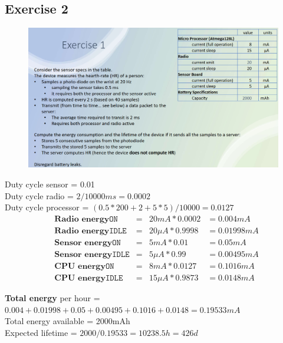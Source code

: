 \subsection*{Exercise 2}
\begin{figure}[htbp]
   \centering
   \includegraphics{images/energy_exercise2.png}
   \label{fig:energy_exercise2}
\end{figure}

Duty cycle sensor = 0.01\\
Duty cycle radio = $2 / 10000ms = 0.0002$\\
Duty cycle processor = $(0.5 * 200 + 2 + 5*5)/10000 = 0.0127$
\begin{align*}
   &\textbf{Radio energy} \texttt{ON} &=& 20mA * 0.0002 &= 0.004mA\\ 
   &\textbf{Radio energy} \texttt{IDLE} &=& 20\mu A * 0.9998 &= 0.01998mA\\
   &\textbf{Sensor energy} \texttt{ON} &=& 5mA *0.01 &= 0.05mA\\
   &\textbf{Sensor energy} \texttt{IDLE} &=& 5\mu A *0.99 &= 0.00495mA\\
   &\textbf{CPU energy} \texttt{ON} &=& 8mA * 0.0127 &= 0.1016mA\\
   &\textbf{CPU energy} \texttt{IDLE} &=& 15\mu A * 0.9873 &= 0.0148mA
\end{align*}

\textbf{Total energy} per hour =\\
$0.004 + 0.01998 + 0.05 + 0.00495 + 0.1016 + 0.0148 = 0.19533mA$\\
Total energy available = 2000mAh\\
Expected lifetime = $2000 / 0.19533 = 10238.5h = 426d$
